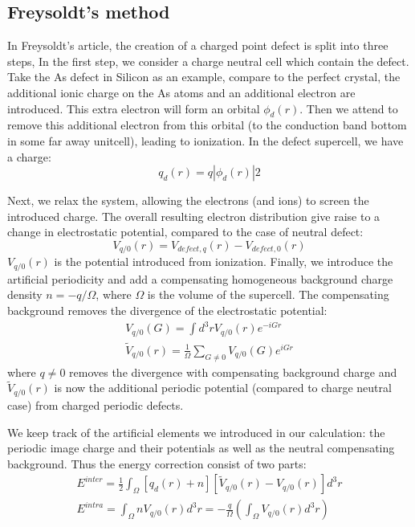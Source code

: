 \documentclass{article}
\begin{document}
\subsection*{Freysoldt's method}
In Freysoldt's article, the creation of a charged point defect is split into three steps, 
In the first step, we consider a charge neutral cell which contain the defect. Take the 
As defect in Silicon as an example, compare to the perfect crystal, the additional ionic charge
on the As atoms and an additional electron are introduced. This extra electron will form an orbital
$\phi_d(r)$. Then we attend to remove this additional electron from this orbital 
(to the conduction band bottom in some far away unitcell), leading to ionization. In the defect 
supercell, we have a charge:
\begin{equation}
    q_d(r) = q |\phi_d(r)|2
\end{equation}

Next, we relax the system, allowing the electrons (and ions) to screen the introduced charge. The overall
resulting electron distribution give raise to a change in electrostatic potential, compared to the 
case of neutral defect:
\begin{equation}
    V_{q/0}(r) = V_{defect,q}(r) - V_{defect,0}(r) \label{charge_potential}
\end{equation}
$V_{q/0}(r)$ is the potential introduced from ionization. 
Finally, we introduce the artificial periodicity and add a compensating homogeneous background charge density
$n = -q/\Omega$, where $\Omega$ is the volume of the supercell. The compensating background removes the 
divergence of the electrostatic potential:
\begin{align}
    V_{q/0}(G) = \int d^3r V_{q/0}(r) e^{-iGr} \\
    \tilde{V}_{q/0}(r) = \frac{1}{\Omega} \sum_{G\neq 0} V_{q/0}(G) e^{iGr} \label{fourier}
\end{align}
where $q\neq 0$ removes the divergence with compensating background charge and $\tilde{V}_{q/0}(r)$ is now the 
additional periodic potential (compared to charge neutral case) from charged periodic defects. 

We keep track of the artificial elements we introduced in our calculation: the periodic image charge and their 
potentials as well as the neutral compensating background. Thus the energy correction consist of two parts:
\begin{align}
    E^{inter} = \frac{1}{2} \int_{\Omega}  [q_d(r) + n ]  [ \tilde{V}_{q/0}(r) - V_{q/0}(r)  ] d^3 r \\
    E^{intra} = \int_{\Omega} n V_{q/0}(r) d^3r = -\frac{q}{\Omega} \left( \int_{\Omega} V_{q/0}(r) d^3 r \right)
\end{align}
\end{document}
